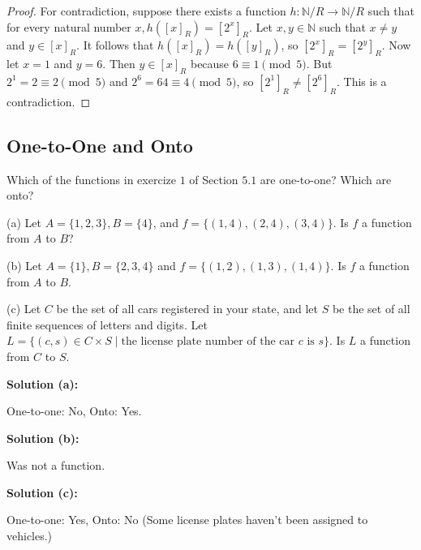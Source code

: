 \begin{proof}
    For contradiction, suppose there exists a function $h : \mathbb{N} / R \rightarrow \mathbb{N} / R$
    such that for every natural number $x, h([x]_R) = [2^x]_R$.
    Let $x, y \in \mathbb{N}$ such that $x \ne y$ and $y \in [x]_R$.
    It follows that $h([x]_R) = h([y]_R)$, so $[2^x]_R = [2^y]_R$.
    Now let $x = 1$ and $y = 6$. Then $y \in [x]_R$ because $6 \equiv 1 \pmod{5}$.
    But $2^1 = 2 \equiv 2 \pmod{5}$ and $2^6 = 64 \equiv 4 \pmod{5}$, 
    so $[2^1]_R \ne [2^6]_R$. This is a contradiction.
\end{proof}

\subsection{One-to-One and Onto}

\begin{tcolorbox}[title=Problem 1, breakable]
    Which of the functions in exercize $1$ of Section $5.1$
        are one-to-one? Which are onto?

    (a) Let $A = \{1, 2, 3\}, B = \{4\}$, and 
        $f = \{(1, 4), (2, 4), (3, 4)\}$.
        Is $f$ a function from $A$ to $B$?

    (b) Let $A = \{1\}, B = \{2, 3, 4\}$ and
        $f = \{(1, 2), (1, 3), (1, 4)\}$.
        Is $f$ a function from $A$ to $B$.

    (c) Let $C$ be the set of all cars registered
        in your state, and let $S$ be the set of all
        finite sequences of letters and digits.
        Let $L = \{(c, s) \in C \times S \mid 
            \text{the license plate number of the car $c$ is $s$}\}$.
        Is $L$ a function from $C$ to $S$.
\end{tcolorbox}

\textbf{Solution (a):}
\begin{center}
    One-to-one: No, Onto: Yes.
\end{center}
\textbf{Solution (b):}
\begin{center}
    Was not a function.
\end{center}
\textbf{Solution (c):}
\begin{center}
    One-to-one: Yes, Onto: No (Some license plates haven't been assigned to vehicles.)
\end{center}

